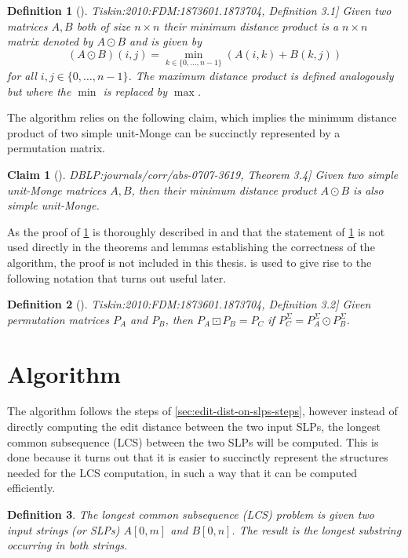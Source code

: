 \documentclass[twoside,11pt,openright]{report}
\newcommand{\str}[3]{#1[#2, #3]}
\newcommand{\refbook}[2]{\cite[#1]{DBLP:journals/corr/abs-0707-3619}, #2}
\newcommand{\reftiskin}[2]{\cite[#1]{Tiskin:2010:FDM:1873601.1873704}, #2}
\newtheorem{mydef}{Definition}
\newtheorem{claim}{Claim}
\begin{document}
\begin{mydef}[\reftiskin{p. 1289}{Definition 3.1}]
  \label{def:minimum-distance-product}
  Given two matrices $A, B$ both of size $n \times n$ their minimum distance product is a $n \times n$ matrix denoted by $A \odot B$ and is given by
  \[
    (A \odot B)(i, j) = \min_{k \in \{ 0, \dots, n - 1 \}} \left( A(i, k) + B(k, j) \right)
  \]
  for all $i, j \in \{0, \dots, n - 1\}$.
  The maximum distance product is defined analogously but where the $\min$ is replaced by $\max$.
\end{mydef}
The algorithm relies on the following claim, which implies the minimum distance product of two simple unit-Monge can be succinctly represented by a permutation matrix.
\begin{claim}[\refbook{p. 16}{Theorem 3.4}]
  \label{claim:unit-monge-min-prod-closed}
  Given two simple unit-Monge matrices $A, B$, then their minimum distance product $A \odot B$ is also simple unit-Monge.
\end{claim}
As the proof of \cref{claim:unit-monge-min-prod-closed} is thoroughly described in \cite[Theorem 3.4, p. 16]{DBLP:journals/corr/abs-0707-3619} and that the statement of \cref{claim:unit-monge-min-prod-closed} is not used directly in the theorems and lemmas establishing the correctness of the algorithm, the proof is not included in this thesis.  is used to give rise to the following notation that turns out useful later.
\begin{mydef}[\reftiskin{p. 1289}{Definition 3.2}]
  Given permutation matrices $P_A$ and $P_B$, then $P_A \boxdot P_B = P_C$ if $P_C^{\Sigma} = P_A^{\Sigma} \odot P_B^{\Sigma}$.
\end{mydef}

\section{Algorithm}
The algorithm follows the steps of \cref{sec:edit-dist-on-slps-steps}, however instead of directly computing the edit distance between the two input SLPs, the longest common subsequence (LCS) between the two SLPs will be computed. This is done because it turns out that it is easier to succinctly represent the structures needed for the LCS computation, in such a way that it can be computed efficiently.

\begin{mydef}
  The longest common subsequence (LCS) problem is given two input strings (or SLPs) $\str{A}{0}{m}$ and $\str{B}{0}{n}$. The result is the longest substring occurring in both strings.
\end{mydef}
\end{document}
